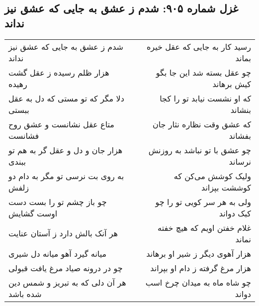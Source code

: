 \begin{center}
\section*{غزل شماره ۹۰۵: شدم ز عشق به جایی که عشق نیز نداند}
\label{sec:0905}
\begin{longtable}{l p{0.5cm} r}
شدم ز عشق به جایی که عشق نیز نداند
&&
رسید کار به جایی که عقل خیره بماند
\\
هزار ظلم رسیده ز عقل گشت رهیده
&&
چو عقل بسته شد این جا بگو کیش برهاند
\\
دلا مگر که تو مستی که دل به عقل ببستی
&&
که او نشست نیابد تو را کجا بنشاند
\\
متاع عقل نشانست و عشق روح فشانست
&&
که عشق وقت نظاره نثار جان بفشاند
\\
هزار جان و دل و عقل گر به هم تو ببندی
&&
چو عشق با تو نباشد به روزنش نرساند
\\
به روی بت نرسی تو مگر به دام دو زلفش
&&
ولیک کوشش می‌کن که کوششت بپزاند
\\
چو باز چشم تو را بست دست اوست گشایش
&&
ولی به هر سر کویی تو را چو کبک دواند
\\
هر آنک بالش دارد ز آستان عنایت
&&
غلام خفتن اویم که هیچ خفته نماند
\\
میانه گیرد آهو میانه دل شیری
&&
هزار آهوی دیگر ز شیر او برهاند
\\
چو در درونه صیاد مرغ یافت قبولی
&&
هزار مرغ گرفته ز دام او بپراند
\\
هر آن دلی که به تبریز و شمس دین شده باشد
&&
چو شاه ماه به میدان چرخ اسب دواند
\\
\end{longtable}
\end{center}
